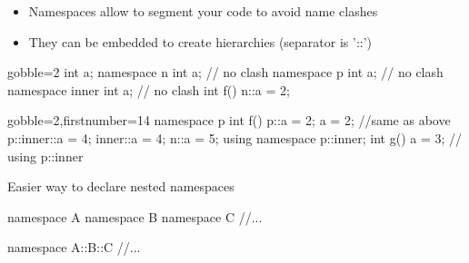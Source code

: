 \begin{frame}[fragile]
  \begin{itemize}
  \item Namespaces allow to segment your code to avoid name clashes
  \item They can be embedded to create hierarchies (separator is '::')
  \end{itemize}
  \begin{multicols}{2}
    \begin{cppcode*}{gobble=2}
      int a;
      namespace n {
        int a;   // no clash
      }
      namespace p {
        int a;   // no clash
        namespace inner {
          int a; // no clash
        }
      }
      int f() {
        n::a = 2;
      }
    \end{cppcode*}
    \columnbreak
    \begin{cppcode*}{gobble=2,firstnumber=14}
      namespace p {
        int f() {
          p::a = 2;
          a = 2;  //same as above
          p::inner::a = 4;
          inner::a = 4;
          n::a = 5;
        }
      }
      using namespace p::inner;
      int g() {
        a = 3; // using p::inner
      }
  \end{cppcode*}
  \end{multicols}
\end{frame}

\begin{frame}[fragile]
  Easier way to declare nested namespaces
  \begin{alertblock}{}
    \begin{cppcode*}{}
      namespace A {
        namespace B {
          namespace C {
            //...
          }
        }
      }
    \end{cppcode*}
  \end{alertblock}
  \begin{exampleblock}{}
    \begin{cppcode*}{}
      namespace A::B::C {
        //...
      }
    \end{cppcode*}
  \end{exampleblock}
\end{frame}

